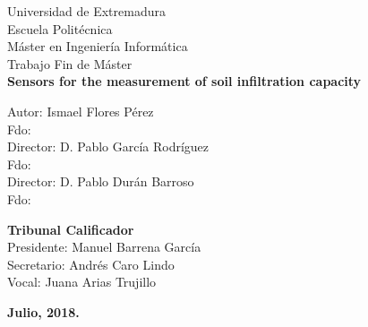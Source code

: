 \begin{center}
{\huge Universidad de Extremadura}\\[0.5cm]
{\LARGE Escuela Politécnica}\\[0.5cm]
{\Large Máster en Ingeniería Informática}\\[0.5cm]
{\Large Trabajo Fin de Máster}\\[0.3cm]
{\Large \textbf{Sensors for the measurement of soil infiltration capacity}}\\[0.5cm]
\end{center}


\begin{center}
{\normalsize Autor: Ismael Flores Pérez}\\[0.05cm]
{\normalsize Fdo:}\\[0.10cm]
{\normalsize Director: D. Pablo García Rodríguez}\\[0.05cm]
{\normalsize Fdo:}\\[0.10cm]
{\normalsize Director: D. Pablo Durán Barroso}\\[0.05cm]
{\normalsize Fdo:}\\[0.6cm]
\end{center}


\begin{flushleft}
{\normalsize \textbf{Tribunal Calificador}}\\[0.2cm]

{\normalsize Presidente: Manuel Barrena García}\\[0.2cm]
{\normalsize Secretario: Andrés Caro Lindo}\\[0.2cm]
{\normalsize Vocal: Juana Arias Trujillo}\\[0.2cm]
\end{flushleft}


\begin{center}
\vspace*{0.2cm}
\textbf{Julio, 2018.}
\end{center}

\afterpage{\blankpage}
\newpage

